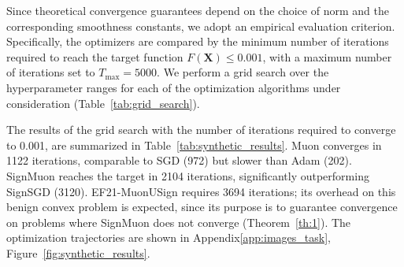 \documentclass[letterpaper]{article} %
\begin{document}
Since theoretical convergence guarantees depend on the choice of norm and the corresponding smoothness constants, we adopt an empirical evaluation criterion. Specifically, the optimizers are compared by the minimum number of iterations required to reach the target function $F(\mathbf{X}) \le 0.001$, with a maximum number of iterations set to $T_{\max} = 5000$.  We perform a grid search over the hyperparameter ranges for each of the optimization algorithms under consideration (Table~\ref{tab:grid_search}).

The results of the grid search with the number of iterations required to converge to 0.001, are summarized in Table~\ref{tab:synthetic_results}. Muon converges in 1122 iterations, comparable to SGD (972) but slower than Adam (202). SignMuon reaches the target in 2104 iterations, significantly outperforming SignSGD (3120). EF21-MuonUSign requires 3694 iterations; its overhead on this benign convex problem is expected, since its purpose is to guarantee convergence on problems where SignMuon does not converge (Theorem~\ref{th:1}). The optimization trajectories are shown in Appendix\ref{app:images_task}, Figure~\ref{fig:synthetic_results}.

\end{document}
